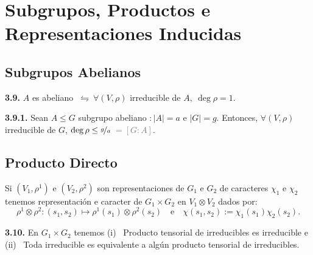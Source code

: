\section{Subgrupos, Productos e Representaciones Inducidas}

\subsection*{Subgrupos Abelianos}

\hypertarget{thm39}{}
\begin{theorem}
    \textbf{3.9.} \(A\) es abeliano \( \ \leftrightharpoons \ \forall (V,\rho)\) irreducible de \(A, \ \deg\rho= 1\).  
\end{theorem}

\begin{corollary}
    \textbf{3.9.1.} Sean \(A \leq G\) subgrupo abeliano \(: |A| = a\) e \(|G| = g\). Entonces, \(\forall (V,\rho)\) irreducible de \(G\), \(\deg \rho \leq \nicefrac{g}{a}\)\textcolor{gray}{\(\ =[G:A]\)}.
\end{corollary}


\subsection*{Producto Directo}

\begin{definition}
    Si \((V_1, \rho^1)\) e \((V_2, \rho^2)\) son representaciones de \(G_1\) e \(G_2\) de caracteres \(\chi_1\) e \(\chi_2\) tenemos representación e caracter de \(G_1 \times G_2\) en \(V_1 \otimes V_2\) dados por:   
    \[\rho^1 \otimes \rho^2 : (s_1,s_2) \mapsto \rho^1(s_1) \otimes \rho^2(s_2) \ \ \ \text{ e } \ \ \ \chi(s_1, s_2) := \chi_1(s_1)\chi_2(s_2). \] 
\end{definition}

\begin{theorem}
    \textbf{3.10.} En \(G_1 \times G_2\) tenemos (i) \ Producto tensorial de irreducibles es irreducible e (ii) \ Toda irreducible es equivalente a algún producto tensorial de irreducibles. 
\end{theorem}

